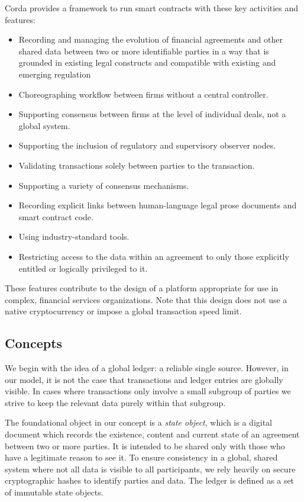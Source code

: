 \documentclass{article}
\begin{document}
Corda provides a framework to run smart contracts with these key activities and features:
\begin{itemize}
    \item{Recording and managing the evolution of financial agreements and other shared data between two or more identifiable parties in a way that is grounded in existing legal constructs and compatible with existing and emerging regulation}
    \item{Choreographing workflow between firms without a central controller.}
    \item{Supporting consensus between firms at the level of individual deals, not a global system.}
    \item{Supporting the inclusion of regulatory and supervisory observer nodes.}
    \item{Validating transactions solely between parties to the transaction.}
    \item{Supporting a variety of consensus mechanisms.}
    \item{Recording explicit links between human-language legal prose documents and smart contract code.}
    \item{Using industry-standard tools.}
    \item{Restricting access to the data within an agreement to only those explicitly entitled or logically privileged to it.}
\end{itemize}
These features contribute to the design of a platform appropriate for use in complex, financial services organizations. Note that this design does not use a native cryptocurrency or impose a global transaction speed limit.

\subsection{Concepts}
We begin with the idea of a global ledger: a reliable single source. However, in our model, it is not the case that transactions and ledger entries are globally visible. In cases where transactions only involve a small subgroup of parties we strive to keep the relevant data purely within that subgroup. 

The foundational object in our concept is a \textit{state object}, which is a digital document which records the existence, content and current state of an agreement between two or more parties. It is intended to be shared only with those who have a legitimate reason to see it. To ensure consistency in a global, shared system where not all data is visible to all participants, we rely heavily on secure cryptographic hashes to identify parties and data. The ledger is defined as a set of immutable state objects.
\end{document}
